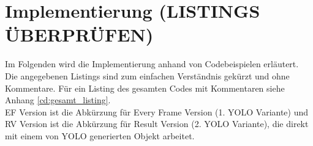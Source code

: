 \chapter{Implementierung (LISTINGS ÜBERPRÜFEN)} 
\label{ch:implementierung}


{\label{implementation_in_python}} 
Im Folgenden wird die Implementierung anhand von Codebeispielen erläutert. Die angegebenen Listings sind zum einfachen Verständnis gekürzt und ohne Kommentare. Für ein Listing des gesamten Codes mit Kommentaren siehe Anhang \ref{cd:gesamt_listing}. \\
EF Version ist die Abkürzung für \glqq Every Frame\grqq{} Version (1. YOLO Variante) und RV Version ist die Abkürzung für \glqq Result\grqq{} Version (2. YOLO Variante), die direkt mit einem von YOLO generierten Objekt arbeitet. 
